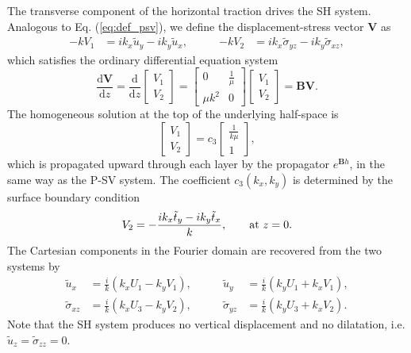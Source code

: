 \documentclass[11pt]{article}
\begin{document}
\begin{large}
The transverse component of the horizontal traction drives the SH system. Analogous to Eq. (\ref{eq:def_psv}), we define the displacement-stress vector $\mathbf{V}$ as
\begin{equation}
\begin{aligned}
    -kV_1 &= ik_x \tilde{u}_y - ik_y \tilde{u}_x, \qquad & -kV_2 &= ik_x \tilde{\sigma}_{yz} - ik_y \tilde{\sigma}_{xz},
\end{aligned}
\end{equation}
which satisfies the ordinary differential equation system
\begin{equation}
    \frac{\mathrm{d}\mathbf{V}}{\mathrm{d}z} = \frac{\mathrm{d}}{\mathrm{d}z}
    \begin{bmatrix}
        V_1 \\ V_2
    \end{bmatrix} = \begin{bmatrix}
        0 & \frac{1}{\mu} \\
        \mu k^2 & 0
    \end{bmatrix} \begin{bmatrix}
        V_1 \\ V_2
    \end{bmatrix} = \mathbf{B}\mathbf{V}.
\label{elastic_ODE_sh}
\end{equation}
The homogeneous solution at the top of the underlying half-space is
\begin{equation}
    \begin{bmatrix}
        V_1 \\ V_2
    \end{bmatrix} = c_3 \begin{bmatrix}
        \frac{1}{k\mu} \\ 1
    \end{bmatrix},
\label{eq:initial_sh}
\end{equation}
which is propagated upward through each layer by the propagator $e^{\mathbf{B}h}$, in the same way as the P-SV system. The coefficient $c_3(k_x,k_y)$ is determined by the surface boundary condition
\begin{equation}
    V_2 = -\frac{ik_x \Tilde{t}_y - ik_y \Tilde{t}_x}{k},\qquad \text{at}\,\,z=0.
\label{eq:bc_sh}
\end{equation}
The Cartesian components in the Fourier domain are recovered from the two systems by
\begin{equation}
\begin{aligned}
    \tilde{u}_x &= \frac{i}{k}\left(k_x U_1 - k_y V_1\right), \qquad & \tilde{u}_y &= \frac{i}{k}\left(k_y U_1 + k_x V_1\right), \\
    \tilde{\sigma}_{xz} &= \frac{i}{k}\left(k_x U_3 - k_y V_2\right), \qquad & \tilde{\sigma}_{yz} &= \frac{i}{k}\left(k_y U_3 + k_x V_2\right).
\end{aligned}
\label{eq:recover}
\end{equation}
Note that the SH system produces no vertical displacement and no dilatation, i.e. $\tilde{u}_z = \tilde{\sigma}_{zz} = 0$.

\end{large}
\end{document}
